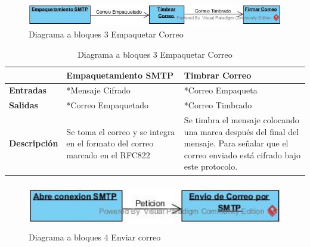 \begin{figure}[H]
	\includegraphics[width=1\linewidth, height=1cm]{./images/bloques3.jpg}
	\caption{Diagrama a bloques 3 Empaquetar Correo}
	\label{fig:5-3-1}
\end{figure}

\begin{table}[H]
 \centering
   {
     \begin{tabular}{| p{4cm} | p{4cm} | p{4cm} |}
     \hline
     & \textbf{Empaquetamiento SMTP} & \textbf{Timbrar Correo}\\
     \hline
     \textbf{Entradas} & *Mensaje Cifrado & *Correo Empaqueta\\
     \hline
     \textbf{Salidas} & *Correo Empaquetado & *Correo Timbrado\\
     \hline
     \textbf{Descripción} & Se toma el correo y se integra en el formato del correo marcado en el RFC822 & Se timbra el mensaje colocando una marca después del final del mensaje. Para señalar que el correo enviado está cifrado bajo este protocolo.\\

    \end{tabular}
    }
    \caption{Diagrama a bloques 3 Empaquetar Correo}
    \label{tabla:b3}
\end{table}

\begin{figure}[H]
	\includegraphics[width=1\linewidth, height=2cm]{./images/bloques4.jpg}
	\caption{Diagrama a bloques 4 Enviar correo}
	\label{fig:5-4-1}
\end{figure}

